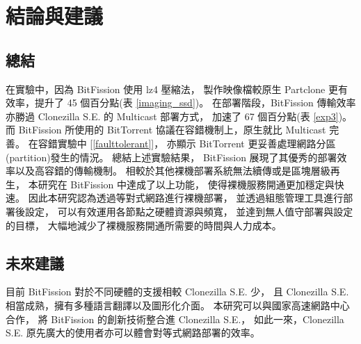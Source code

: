 \chapter{結論與建議}
\label{c:conclusion}
\section{總結}
在實驗中，因為 BitFission 使用 lz4 壓縮法，
製作映像檔較原生 Partclone 更有效率，提升了 45 個百分點(表 \ref{imaging_ssd})。
在部署階段，BitFission 傳輸效率亦勝過 Clonezilla S.E. 的 Multicast 部署方式，
加速了 67 個百分點(表 \ref{exp3})。
而 BitFission 所使用的 BitTorrent 協議在容錯機制上，原生就比 Multicast 完善。
在容錯實驗中 [\ref{faulttolerant}]，
亦顯示 BitTorrent 更妥善處理網路分區(partition)發生的情況。
總結上述實驗結果，
BitFission 展現了其優秀的部署效率以及高容錯的傳輸機制。
相較於其他裸機部署系統無法續傳或是區塊層級再生，
本研究在 BitFission 中達成了以上功能，
使得裸機服務開通更加穩定與快速。
因此本研究認為透過等對式網路進行裸機部署，
並透過組態管理工具進行部署後設定，
可以有效運用各節點之硬體資源與頻寬，
並達到無人值守部署與設定的目標，
大幅地減少了裸機服務開通所需要的時間與人力成本。

\section{未來建議}
目前 BitFission 對於不同硬體的支援相較 Clonezilla S.E. 少，
且 Clonezilla S.E. 相當成熟，擁有多種語言翻譯以及圖形化介面。
本研究可以與國家高速網路中心合作，
將 BitFission 的創新技術整合進 Clonezilla S.E.，
如此一來，Clonezilla S.E. 原先廣大的使用者亦可以體會對等式網路部署的效率。
